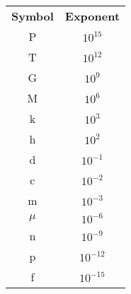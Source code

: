     \begin{tabular}{c c}
        \textbf{Symbol} & \textbf{Exponent}\\
        P & $10^{15}$ \\
        T & $10^{12}$ \\
        G & $10^9$ \\
        M & $10^6$ \\
        k & $10^3$ \\
        h & $10^2$ \\
        d & $10^{-1}$ \\
        c & $10^{-2}$ \\
        m & $10^{-3}$ \\
        $\mu$ & $10^{-6}$ \\
        n & $10^{-9}$ \\
        p & $10^{-12}$ \\
        f & $10^{-15}$ \\
    \end{tabular}